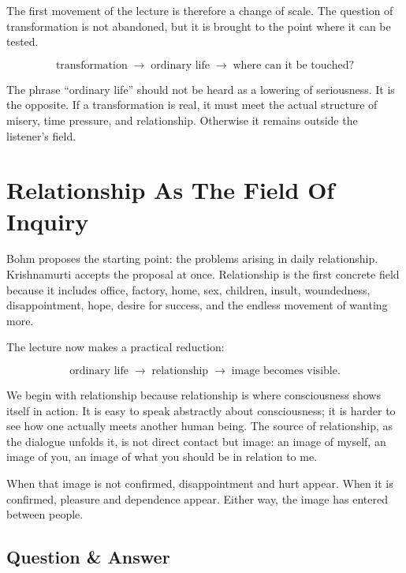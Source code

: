 The first movement of the lecture is therefore a change of scale. The question of transformation is not abandoned, but it is brought to the point where it can be tested.

\begin{equation}
\text{transformation}
\;\longrightarrow\;
\text{ordinary life}
\;\longrightarrow\;
\text{where can it be touched?}
\end{equation}

The phrase ``ordinary life'' should not be heard as a lowering of seriousness. It is the opposite. If a transformation is real, it must meet the actual structure of misery, time pressure, and relationship. Otherwise it remains outside the listener's field.

\section{Relationship As The Field Of Inquiry}

Bohm proposes the starting point: the problems arising in daily relationship. Krishnamurti accepts the proposal at once. Relationship is the first concrete field because it includes office, factory, home, sex, children, insult, woundedness, disappointment, hope, desire for success, and the endless movement of wanting more.

The lecture now makes a practical reduction:

\begin{equation}
\text{ordinary life}
\;\longrightarrow\;
\text{relationship}
\;\longrightarrow\;
\text{image becomes visible}.
\end{equation}

We begin with relationship because relationship is where consciousness shows itself in action. It is easy to speak abstractly about consciousness; it is harder to see how one actually meets another human being. The source of relationship, as the dialogue unfolds it, is not direct contact but image: an image of myself, an image of you, an image of what you should be in relation to me.

When that image is not confirmed, disappointment and hurt appear. When it is confirmed, pleasure and dependence appear. Either way, the image has entered between people.

\subsection{Question \& Answer}

